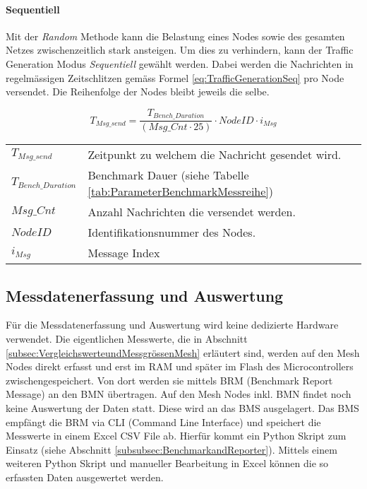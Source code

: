 \paragraph{Sequentiell}
Mit der \textit{Random} Methode kann die Belastung eines Nodes sowie des gesamten Netzes zwischenzeitlich stark ansteigen.
Um dies zu verhindern, kann der Traffic Generation Modus \textit{Sequentiell} gewählt werden.
Dabei werden die Nachrichten in regelmässigen Zeitschlitzen gemäss Formel \ref{eq:TrafficGenerationSeq} pro Node versendet. Die Reihenfolge der Nodes bleibt jeweils die selbe.


\begin{equation}\label{eq:TrafficGenerationSeq}
T_{Msg\_send} =  \frac{T_{Bench\_Duration}}{(Msg\_Cnt \cdot 25)} \cdot NodeID \cdot i_{Msg}
\end{equation}

\begin{small}
\begin{center}
\begin{tabular}{ll}
$T_{Msg\_send}$ & Zeitpunkt zu welchem die Nachricht gesendet wird.\\
$T_{Bench\_Duration}$ & Benchmark Dauer (siehe Tabelle \ref{tab:ParameterBenchmarkMessreihe})\\
$Msg\_Cnt$ & Anzahl Nachrichten die versendet werden.\\
$NodeID$ &Identifikationsnummer des Nodes. \\
$i_{Msg}$ & Message Index
\end{tabular}
\end{center}
\end{small}

\subsection{Messdatenerfassung und Auswertung}\label{subsec:MessdatenerfassungundAuswertung}
Für die Messdatenerfassung und Auswertung wird keine dedizierte Hardware verwendet. Die eigentlichen Messwerte, die in Abschnitt \ref{subsec:VergleichswerteundMessgrössenMesh} erläutert sind, werden auf den Mesh Nodes direkt erfasst und erst im RAM und später im Flash des Microcontrollers zwischengespeichert. Von dort werden sie mittels BRM (Benchmark Report Message) an den BMN übertragen.
Auf den Mesh Nodes inkl. BMN findet noch keine Auswertung der Daten statt.
Diese wird an das BMS ausgelagert.
Das BMS empfängt die BRM via CLI (Command Line Interface) und speichert die Messwerte in einem Excel CSV File ab. Hierfür kommt ein Python Skript zum Einsatz (siehe Abschnitt \ref{subsubsec:BenchmarkandReporter}).
Mittels einem weiteren Python Skript und manueller Bearbeitung in Excel können die so erfassten Daten ausgewertet werden.


